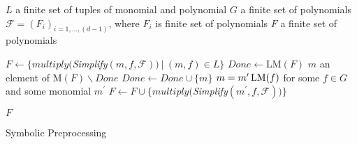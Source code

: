 \begin{algorithm}[ht]
  \begin{algorithmic}[1]
    \Require
      \Statex $L$ a finite set of tuples of monomial and polynomial
      \Statex $G$ a finite set of polynomials
      \Statex $\mathcal{F} = (F_i)_{i=1,\ldots,(d-1)}$, where $F_i$ is finite set of polynomials
    \Ensure
      \Statex $F$ a finite set of polynomials
      \Statex

    \State $F \gets \big\{multiply($\textit{Simplify}$(m, f, \mathcal{F}))\ |\ (m, f)\in L\big\}$
    \State $Done \gets \textrm{LM}(F)$
      \State $m$ an element of $\textrm{M}(F)\backslash Done$
      \State $Done \gets Done \cup \{m\}$
        \State $m = m^\prime\operatorname{LM}(f)$ for some $f \in G$ and some monomial $m^\prime$
        \State $F \gets F \cup \big\{multiply($\textit{Simplify}$(m^\prime, f, \mathcal{F}))\big\}$
      \EndIf
    \EndWhile

    \State \Return $F$

  \end{algorithmic}
  \caption{Symbolic Preprocessing}
  \label{alg:symbolicPreprocessing}
\end{algorithm}

